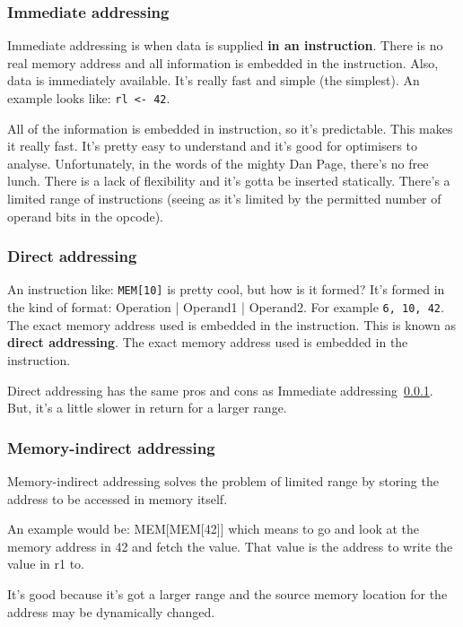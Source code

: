 \documentclass[11pt,a4paper,titlepage,dvipsnames,cmyk]{scrartcl}
\begin{document}
\subsubsection{Immediate addressing}%
\label{ssub:immediate}
Immediate addressing is when data is supplied \textbf{in an instruction}.
There is no real memory address and all information is embedded in the
instruction. Also, data is immediately available. It's really fast and
simple (the simplest). An example looks like: \lstinline|rl <- 42|.

All of the information is embedded in instruction, so it's predictable.
This makes it really fast. It's pretty easy to understand and it's good
for optimisers to analyse. Unfortunately, in the words of the mighty Dan
Page, there's no free lunch. There is a lack of flexibility and it's gotta
be inserted statically. There's a limited range of instructions (seeing as
it's limited by the permitted number of operand bits in the opcode).

\subsubsection{Direct addressing}%
\label{ssub:direct}
An instruction like: \lstinline|MEM[10]| is pretty cool, but how is it
formed? It's formed in the kind of format: Operation | Operand1 |
Operand2. For example \lstinline|6, 10, 42|. The exact memory address used
is embedded in the instruction. This is known as \textbf{direct
addressing}. The exact memory address used is embedded in the instruction.

Direct addressing has the same pros and cons as Immediate
addressing~\ref{ssub:immediate}. But, it's a little slower in return for
a larger range.

\subsubsection{Memory-indirect addressing}%
\label{ssub:memory-indirect}

Memory-indirect addressing solves the problem of limited range by storing
the address to be accessed in memory itself. 

An example would be: MEM[MEM[42]] which means to go and look at the memory
address in 42 and fetch the value. That value is the address to write the
value in r1 to.

It's good because it's got a larger range and the source memory location
for the address may be dynamically changed.
\end{document}

